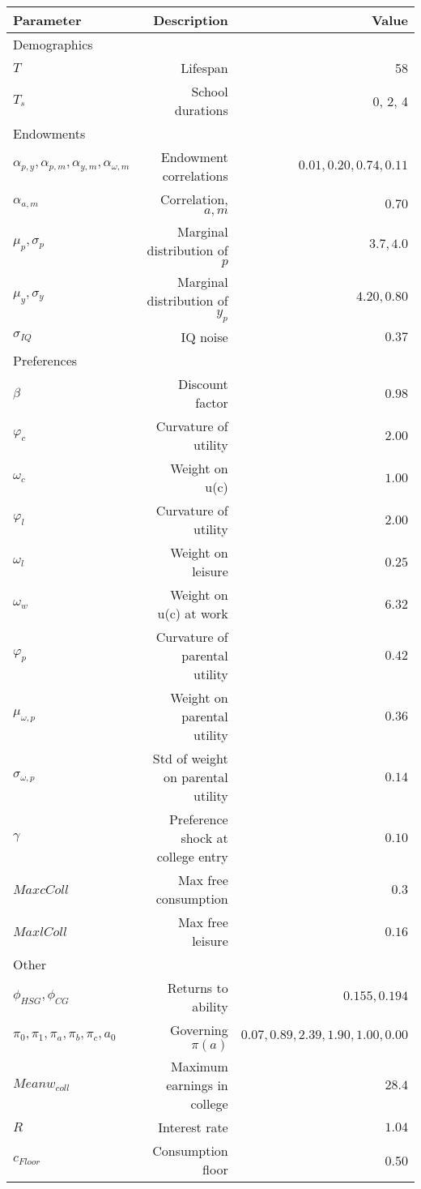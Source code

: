 \begin{tabular}{lrr}
\hline
Parameter & Description  & Value  \\
\hline
Demographics &   &   \\
$T$ & Lifespan  & 58  \\
$T_{s}$ & School durations  & 0, 2, 4  \\
Endowments &   &   \\
$\alpha_{p,y}, \alpha_{p,m}, \alpha_{y,m}, \alpha_{\omega,m}$ & Endowment correlations  & $0.01, 0.20, 0.74, 0.11$  \\
$\alpha_{a,m}$ & Correlation, $a,m$  & $0.70$  \\
$\mu_{p}, \sigma_{p}$ & Marginal distribution of $p$  & $3.7, 4.0$  \\
$\mu_{y}, \sigma_{y}$ & Marginal distribution of $y_{p}$  & $4.20, 0.80$  \\
$\sigma_{IQ}$ & IQ noise  & $0.37$  \\
Preferences &   &   \\
$\beta$ & Discount factor  & $0.98$  \\
$\varphi_{c}$ & Curvature of utility  & $2.00$  \\
$\omega_{c}$ & Weight on u(c)  & $1.00$  \\
$\varphi_{l}$ & Curvature of utility  & $2.00$  \\
$\omega_{l}$ & Weight on leisure  & $0.25$  \\
$\omega_{w}$ & Weight on u(c) at work  & $6.32$  \\
$\varphi_{p}$ & Curvature of parental utility  & $0.42$  \\
$\mu_{\omega,p}$ & Weight on parental utility  & $0.36$  \\
$\sigma_{\omega,p}$ & Std of weight on parental utility  & $0.14$  \\
$\gamma$ & Preference shock at college entry  & $0.10$  \\
$Max cColl$ & Max free consumption  & $0.3$  \\
$Max lColl$ & Max free leisure  & $0.16$  \\
Other &   &   \\
$\phi_{HSG}, \phi_{CG}$ & Returns to ability  & $0.155, 0.194$  \\
$\pi_{0}, \pi_{1}, \pi_{a}, \pi_{b}, \pi_{c}, a_{0}$ & Governing $\pi(a)$  & $0.07, 0.89, 2.39, 1.90, 1.00, 0.00$  \\
$Mean w_{coll}$ & Maximum earnings in college  & $28.4$  \\
$R$ & Interest rate  & $1.04$  \\
$c_{Floor}$ & Consumption floor  & 0.50  \\
\hline
\end{tabular}%
